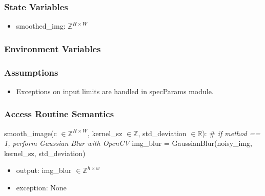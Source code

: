 \documentclass[12pt, titlepage]{article}
\begin{document}
\subsubsection{State Variables}
\begin{itemize}
  \item smoothed\_img: $\mathbb{Z}^{H \times W}$
\end{itemize}

\subsubsection{Environment Variables}


\subsubsection{Assumptions}
  \begin{itemize}
  \item Exceptions on input limits are handled in specParams module.
  \end{itemize}

\subsubsection{Access Routine Semantics}

\noindent smooth\_image(c $\in \mathbb{Z}^{H \times W}$, 
kernel\_sz $\in \mathbb{Z}$, std\_deviation $\in \mathbb{R}$):\newline \newline
\# \textit{if method == 1, perform Gaussian Blur with OpenCV }\newline
img\_blur = GaussianBlur(noisy\_img, kernel\_sz, std\_deviation)\newline
\begin{itemize}
\item output: img\_blur $\in \mathbb{Z}^{h \times w}$
\end{itemize}

\begin{itemize}
\item exception: None
\end{itemize}




\end{document}
